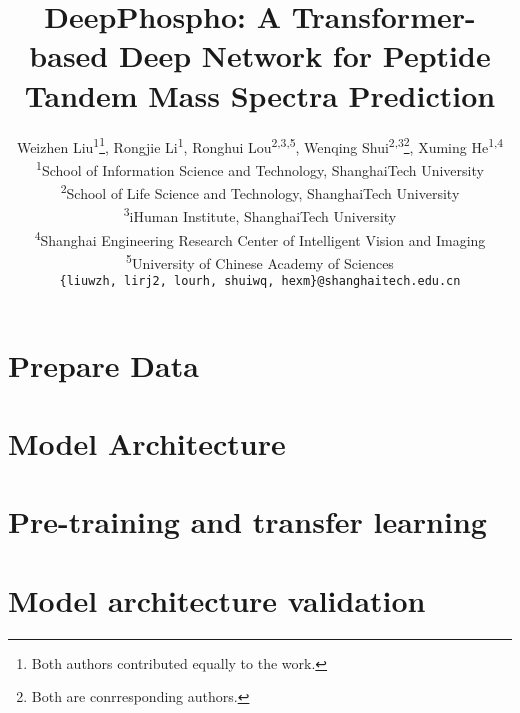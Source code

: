 \documentclass[final]{cvpr}
\begin{document}
\title{DeepPhospho: A Transformer-based Deep Network for Peptide \\Tandem Mass Spectra Prediction}

\author{Weizhen Liu\textsuperscript{1}\thanks{Both authors contributed equally to the work.}, Rongjie Li\textsuperscript{1}\footnotemark[1], 
Ronghui Lou\textsuperscript{2,3,5}, 
Wenqing Shui\textsuperscript{2,3}\thanks{Both are conrresponding authors.}, 
Xuming He\textsuperscript{1,4}\footnotemark[2]\\
\textsuperscript{1}School of Information Science and Technology, ShanghaiTech University\\
\textsuperscript{2}School of Life Science and Technology, ShanghaiTech University\\
\textsuperscript{3}iHuman Institute, ShanghaiTech University\\
\textsuperscript{4}Shanghai Engineering Research Center of Intelligent Vision and Imaging\\
\textsuperscript{5}University of Chinese Academy of Sciences\\
{\tt\small \{liuwzh, lirj2, lourh, shuiwq, hexm\}@shanghaitech.edu.cn}
}

\maketitle

% 


% 

% 

\section{Prepare Data}


\section{Model Architecture}


\section{Pre-training and transfer learning}




\section{Model architecture validation}


{\small


}
\end{document}
